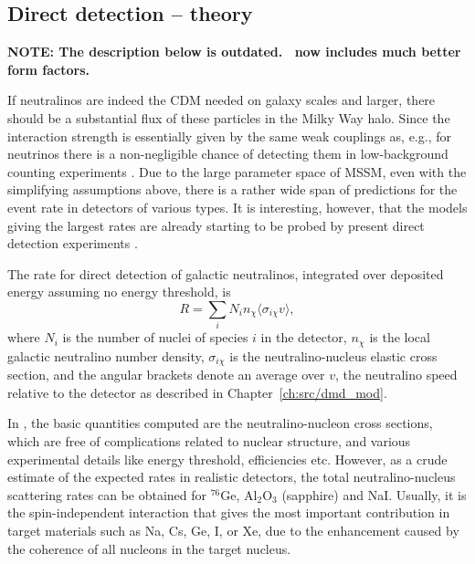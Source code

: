 \subsection{Direct detection -- theory}

{\bfseries NOTE: The description below is outdated. \ds\ now includes
much better form factors.}

If  neutralinos are indeed the CDM needed on galaxy scales and larger,
there should be a substantial flux of these particles in the Milky
Way halo. Since the interaction strength  is
essentially given by the same weak couplings as, e.g., for neutrinos
there is a non-negligible chance of detecting them in low-background
counting experiments \cite{Goodman:1984dc}.
Due to the large parameter space of MSSM, even
with the simplifying assumptions above, there is a rather wide span of
predictions for the event rate in detectors of various types. It is
interesting, however, that the models giving the largest rates are
already starting to be probed by present direct detection
experiments \cite{Bergstrom:1995cz,Bottino:1996eu}.


The rate for direct detection of galactic neutralinos, integrated over
deposited energy assuming no energy threshold, is
\begin{equation}
   R = \sum_i N_i n_\chi \langle \sigma_{i\chi} v \rangle ,
\end{equation}
where $ N_i $ is the number of nuclei of species $i$ in the detector,
$n_\chi$ is the local galactic neutralino number density, $
\sigma_{i\chi} $ is the neutralino-nucleus elastic cross section, and
the angular brackets denote an average over $ v $, the neutralino
speed relative to the detector as described in Chapter~\ref{ch:src/dmd_mod}.

In \ds, the basic quantities computed are the neutralino-nucleon cross
sections, which are free of complications related to nuclear
structure, and various experimental details like energy threshold,
efficiencies etc.  However, as a crude estimate of the expected rates
in realistic detectors, the total neutralino-nucleus scattering rates
can be obtained for $^{76}$Ge, Al$_2$O$_3$ (sapphire) and NaI.
Usually, it is the spin-independent interaction that gives the most
important contribution in target materials such as Na, Cs, Ge, I, or
Xe, due to the enhancement caused by the coherence of all nucleons in
the target nucleus.

